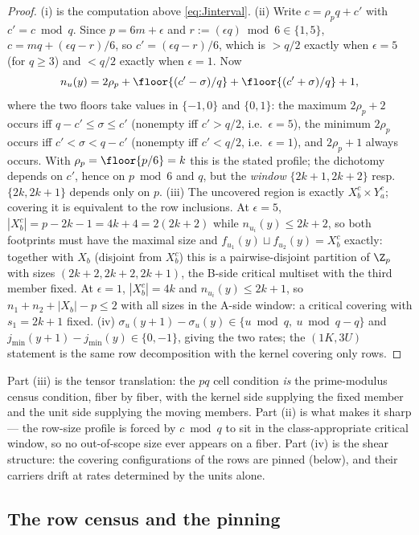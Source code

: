 \begin{proof}
(i) is the computation above \eqref{eq:Jinterval}. (ii) Write
$c=\rho_p q+c'$ with $c'=c\bmod q$. Since $p=6m+\epsilon$ and
$r:=(\epsilon q)\bmod 6\in\{1,5\}$,
$c=mq+(\epsilon q-r)/6$, so $c'=(\epsilon q-r)/6$, which is $>q/2$ exactly
when $\epsilon=5$ (for $q\ge 3$) and $<q/2$ exactly when $\epsilon=1$. Now
\[
n_u(y)=2\rho_p+\floor{(c'-\sigma)/q}+\floor{(c'+\sigma)/q}+1,
\]
where the two floors take values in $\{-1,0\}$ and $\{0,1\}$: the maximum
$2\rho_p+2$ occurs iff $q-c'\le\sigma\le c'$ (nonempty iff $c'>q/2$, i.e.\
$\epsilon=5$), the minimum $2\rho_p$ occurs iff
$c'<\sigma<q-c'$ (nonempty iff $c'<q/2$, i.e.\ $\epsilon=1$), and
$2\rho_p+1$ always occurs. With $\rho_p=\floor{p/6}=k$ this is the stated
profile; the dichotomy depends on $c'$, hence on $p\bmod 6$ and $q$, but the
\emph{window} $\{2k{+}1,2k{+}2\}$ resp.\ $\{2k,2k{+}1\}$ depends only on
$p$. (iii) The uncovered region is exactly $X_b^c\times Y_a^c$; covering it
is equivalent to the row inclusions. At $\epsilon=5$,
$|X_b^{c}|=p-2k-1=4k+4=2(2k+2)$ while $n_{u_i}(y)\le 2k+2$, so both
footprints must have the maximal size and
$f_{u_1}(y)\sqcup f_{u_2}(y)=X_b^{c}$ exactly: together with $X_b$ (disjoint
from $X_b^{c}$) this is a pairwise-disjoint partition of $\Z_p$ with sizes
$(2k+2,2k+2,2k+1)$, the B-side critical multiset with the third member fixed.
At $\epsilon=1$, $|X_b^{c}|=4k$ and $n_{u_i}(y)\le 2k+1$, so
$n_1+n_2+|X_b|-p\le 2$ with all sizes in the A-side window: a critical
covering with $s_1=2k+1$ fixed. (iv) $\sigma_u(y{+}1)-\sigma_u(y)\in\{u
\bmod q,\ u\bmod q-q\}$ and $j_{\min}(y{+}1)-j_{\min}(y)\in\{0,-1\}$, giving
the two rates; the $(1K,3U)$ statement is the same row decomposition with the
kernel covering only rows.
\end{proof}

Part (iii) is the tensor translation: the $pq$ cell condition \emph{is} the
prime-modulus census condition, fiber by fiber, with the kernel side
supplying the fixed member and the unit side supplying the moving members.
Part (ii) is what makes it sharp --- the row-size profile is forced by
$c\bmod q$ to sit in the class-appropriate critical window, so no
out-of-scope size ever appears on a fiber. Part (iv) is the shear structure:
the covering configurations of the rows are pinned (below), and their
carriers drift at rates determined by the units alone.

\subsection{The row census and the pinning}\label{sec:pq-census}

